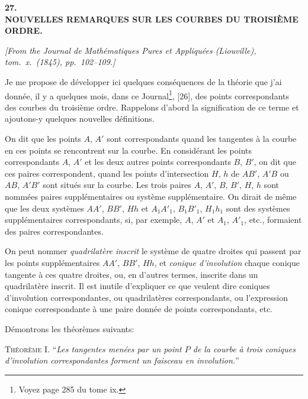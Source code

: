 \documentclass[12pt,a4paper]{article}
\begin{document}
\begin{center}
\textbf{\Large 27.}\\[1em]
\textbf{\Large NOUVELLES REMARQUES SUR LES COURBES DU TROISI\`EME ORDRE.}
\end{center}

\textit{[From the Journal de Math\'ematiques Pures et Appliqu\'ees (Liouville), tom.~x.~(1845), pp.~102--109.]}

\bigskip

Je me propose de d\'evelopper ici quelques cons\'equences de la th\'eorie que j'ai donn\'ee, il y a quelques mois, dans ce Journal\footnote{Voyez page 285 du tome ix.}, [26], des points correspondants des courbes du troisi\`eme ordre. Rappelons d'abord la signification de ce terme et ajoutons-y quelques nouvelles d\'efinitions.

On dit que les points $A$, $A'$ sont correspondants quand les tangentes \`a la courbe en ces points se rencontrent sur la courbe. En consid\'erant les points correspondants $A$, $A'$ et les deux autres points correspondants $B$, $B'$, on dit que ces paires correspondent, quand les points d'intersection $H$, $h$ de $AB'$, $A'B$ ou $AB$, $A'B'$ sont situ\'es sur la courbe. Les trois paires $A$, $A'$, $B$, $B'$, $H$, $h$ sont nomm\'ees paires suppl\'ementaires ou syst\`eme suppl\'ementaire. On dirait de m\^eme que les deux syst\`emes $AA'$, $BB'$, $Hh$ et $A_1 A'_1$, $B_1 B'_1$, $H_1 h_1$ sont des syst\`emes suppl\'ementaires correspondants, si, par exemple, $A$, $A'$ et $A_1$, $A'_1$, etc., formaient des paires correspondantes.

On peut nommer \textit{quadrilat\`ere inscrit} le syst\`eme de quatre droites qui passent par les points suppl\'ementaires $AA'$, $BB'$, $Hh$, et \textit{conique d'involution} chaque conique tangente \`a ces quatre droites, ou, en d'autres termes, inscrite dans un quadrilat\`ere inscrit. Il est inutile d'expliquer ce que veulent dire coniques d'involution correspondantes, ou quadrilat\`eres correspondants, ou l'expression conique correspondante \`a une paire donn\'ee de points correspondants, etc.

D\'emontrons les th\'eor\`emes suivants:

\medskip
\textsc{Th\'eor\`eme I.} ``\textit{Les tangentes men\'ees par un point $P$ de la courbe \`a trois coniques d'involution correspondantes forment un faisceau en involution.}''

\newpage
\setcounter{page}{191}
\end{document}
